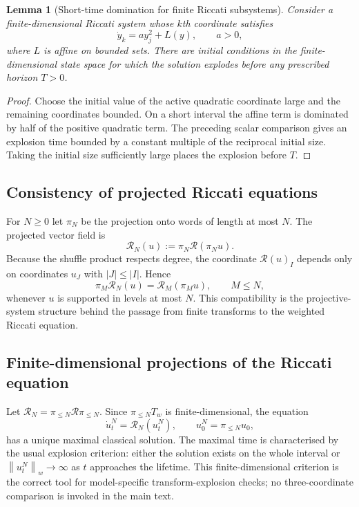 \documentclass[11pt,oneside]{article}
\theoremstyle{plain}
\newtheorem{lemma}[theorem]{Lemma}
\theoremstyle{definition}
\theoremstyle{remark}
\newcommand{\Tw}{T_w}
\newcommand{\Rs}{\mathcal R}
\newcommand{\norm}[1]{\left\lVert #1\right\rVert}
\begin{document}
\begin{lemma}[Short-time domination for finite Riccati subsystems]
\label{lem:short-time-riccati-domination}
Consider a finite-dimensional Riccati system whose $k$th coordinate satisfies
\[
\dot y_k=a y_j^2 + L(y),
\qquad a>0,
\]
where $L$ is affine on bounded sets. There are initial conditions in the finite-dimensional state space for which the solution explodes before any prescribed horizon $T>0$.
\end{lemma}

\begin{proof}
Choose the initial value of the active quadratic coordinate large and the remaining coordinates bounded. On a short interval the affine term is dominated by half of the positive quadratic term. The preceding scalar comparison gives an explosion time bounded by a constant multiple of the reciprocal initial size. Taking the initial size sufficiently large places the explosion before $T$.
\end{proof}

\subsection*{Consistency of projected Riccati equations}
For $N\geq0$ let $\pi_N$ be the projection onto words of length at most $N$. The projected vector field is
\[
\Rs_N(u):=\pi_N\Rs(\pi_Nu).
\]
Because the shuffle product respects degree, the coordinate $\Rs(u)_I$ depends only on coordinates $u_J$ with $|J|\leq |I|$. Hence
\[
\pi_M\Rs_N(u)=\Rs_M(\pi_Mu),
\qquad M\leq N,
\]
whenever $u$ is supported in levels at most $N$. This compatibility is the projective-system structure behind the passage from finite transforms to the weighted Riccati equation.


\subsection*{Finite-dimensional projections of the Riccati equation}
Let $\Rs_N=\pi_{\leq N}\Rs\pi_{\leq N}$. Since $\pi_{\leq N}\Tw$ is finite-dimensional, the equation
\[
\dot u^N_t=\Rs_N(u^N_t),\qquad u^N_0=\pi_{\leq N}u_0,
\]
has a unique maximal classical solution. The maximal time is characterised by the usual explosion criterion: either the solution exists on the whole interval or $\norm{u^N_t}_w\to\infty$ as $t$ approaches the lifetime. This finite-dimensional criterion is the correct tool for model-specific transform-explosion checks; no three-coordinate comparison is invoked in the main text.
\end{document}
